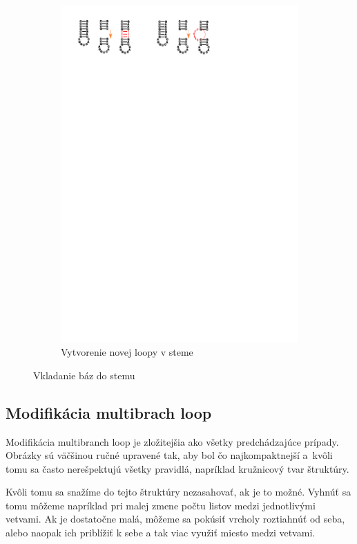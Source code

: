 \begin{figure}
\begin{subfigure}{\wi}
    \includegraphics[clip, trim=8cm 25cm 7cm 1cm, width=1\textwidth]{../img/alg/insert/stem}
    \caption{Vytvorenie novej loopy v steme}
  \end{subfigure}
  \caption{Vkladanie báz do stemu}
  \label{obr:insert_stem}
\end{figure}




\subsection{Modifikácia multibrach loop}

Modifikácia multibranch loop je zložitejšia ako všetky predchádzajúce prípady.
Obrázky sú väčšinou ručné upravené tak, aby bol čo najkompaktnejší a~kvôli tomu
sa často nerešpektujú všetky pravidlá, napríklad kružnicový tvar štruktúry.

Kvôli tomu sa snažíme do tejto štruktúry nezasahovať, ak je to možné.
Vyhnúť sa tomu môžeme napríklad pri malej zmene počtu listov medzi jednotlivými vetvami.
Ak je dostatočne malá, môžeme sa pokúsiť vrcholy roztiahnúť od seba, alebo naopak ich
priblížiť k sebe a tak viac využiť miesto medzi vetvami.

